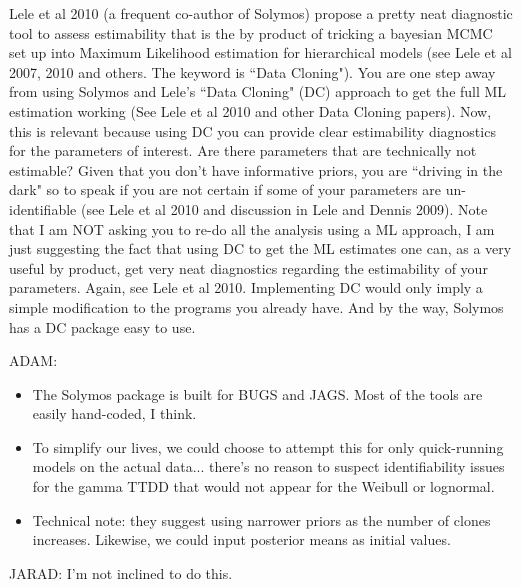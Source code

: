\documentclass[12pt]{article}
\renewenvironment{quote}  %
              {\list{}{\rightmargin\leftmargin}\normalfont%
               \item\relax}
              {\endlist}
\newcommand{\adam}[1]{{\color{blue} ADAM: #1}}
\newcommand{\jarad}[1]{{\color{Orange} JARAD: #1}}
\begin{document}
Lele et al 2010 (a frequent co-author of Solymos) propose a pretty neat diagnostic tool to assess
estimability that is the by product of tricking a bayesian MCMC set up into Maximum Likelihood estimation for hierarchical models (see Lele et al 2007, 2010 and others. The keyword is ``Data Cloning"). You are one step away from using Solymos and Lele's ``Data Cloning" (DC) approach to get the full ML estimation working (See Lele et al 2010 and other Data Cloning papers). Now, this is relevant because using DC you can provide clear estimability diagnostics for the parameters of interest.  Are there parameters that are technically not estimable?  Given that you don't have informative priors, you are ``driving in the dark" so to speak if you are not certain if some of your parameters are un-identifiable (see Lele et al 2010 and discussion in Lele and Dennis 2009).  Note that I am NOT asking you to re-do all the analysis using a ML approach, I am just suggesting the fact that using DC to get the ML estimates one can, as a very useful by product, get very neat diagnostics regarding
the estimability of your parameters.  Again, see Lele et al 2010.  Implementing DC would only imply a simple modification to the programs you already have. And by the way, Solymos has a DC package easy to use.
\begin{quote}
\adam{
\begin{itemize}
\item The Solymos package is built for BUGS and JAGS.  Most of the tools are easily hand-coded, I think.
\item To simplify our lives, we could choose to attempt this for only quick-running models on the actual data... there's no reason to suspect identifiability issues for the gamma TTDD that would not appear for the Weibull or lognormal.
\item Technical note: they suggest using narrower priors as the number of clones increases.  Likewise, we could input posterior means as initial values.
\end{itemize}
}
\jarad{I'm not inclined to do this.}
\end{quote}
\end{document}
